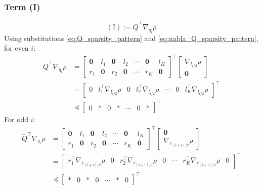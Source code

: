 \documentclass[a4paper,12pt]{article}
\theoremstyle{definition}
\begin{document}
\subsubsection{Term (I)}
$$(\text{I}) := \dddot{Q}^\top \nabla_{\dddot{q}_i} \rho$$
Using substitutions \eqref{eq:Q_sparsity_pattern} and \eqref{eq:nabla_Q_sparsity_pattern}, for even $i$:
\begin{align*}
    \dddot{Q}^\top \nabla_{\dddot{q}_i} \rho &= 
    \begin{bmatrix}\mathbf{0} & l_1 & \mathbf{0} & l_2 & \cdots & \mathbf{0} & l_K \\ r_1 & \mathbf{0} & r_2 & \mathbf{0} &  \cdots & r_K & \mathbf{0} \end{bmatrix} ^\top \begin{bmatrix} \nabla_{l_{i/2}} \rho \\ \mathbf{0} \end{bmatrix}
    \\
    &= \begin{bmatrix} 0 & l_1^\top \nabla_{l_{i/2}} \rho & 0 & l_2^\top \nabla_{l_{i/2}} \rho & \cdots & 0 & l_K^\top \nabla_{l_{i/2}} \rho\end{bmatrix} ^\top
    \\
    &\preceq \begin{bmatrix} 0 & * & 0 & * & \cdots & 0 & * \end{bmatrix}^\top
\end{align*}
For odd $i$: 
\begin{align*}
    \dddot{Q}^\top \nabla_{\dddot{q}_i} \rho &= 
    \begin{bmatrix}\mathbf{0} & l_1 & \mathbf{0} & l_2 & \cdots & \mathbf{0} & l_K \\ r_1 & \mathbf{0} & r_2 & \mathbf{0} &  \cdots & r_K & \mathbf{0} \end{bmatrix} ^\top \begin{bmatrix} \mathbf{0} \\ \nabla_{r_{(i+1)/2}} \rho \end{bmatrix}
    \\
    &= \begin{bmatrix} r_1^\top \nabla_{r_{(i+1)/2}} \rho & 0 & r_2^\top \nabla_{r_{(i+1)/2}} \rho & 0 & \cdots & r_K^\top \nabla_{r_{(i+1)/2}} \rho & 0\end{bmatrix} ^\top
    \\
    &\preceq \begin{bmatrix} * & 0 & * & 0 & \cdots & * & 0 \end{bmatrix}^\top
\end{align*}
\end{document}
